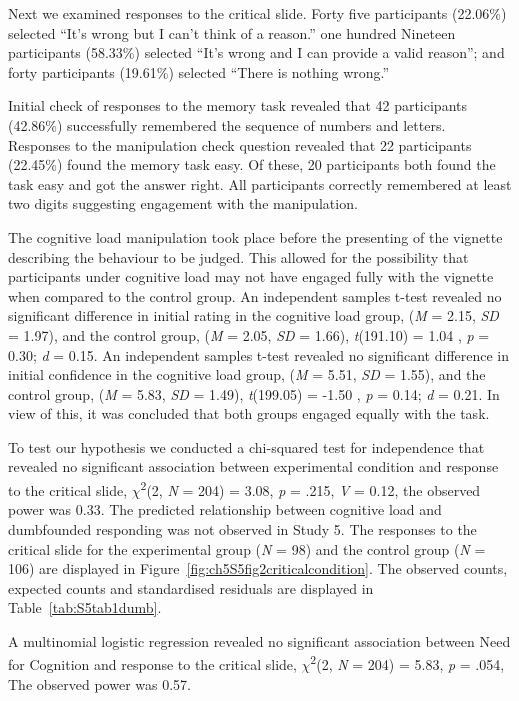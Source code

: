 \documentclass[
  american,
  man,floatsintext]{apa7}
\begin{document}
Next we examined responses to the critical slide. Forty five participants (22.06\%) selected ``It's wrong but I can't think of a reason.'' one hundred Nineteen participants (58.33\%) selected ``It's wrong and I can provide a valid reason''; and forty participants (19.61\%) selected ``There is nothing wrong.''

Initial check of responses to the memory task revealed that 42 participants (42.86\%) successfully remembered the sequence of numbers and letters. Responses to the manipulation check question revealed that 22 participants (22.45\%) found the memory task easy. Of these, 20 participants both found the task easy and got the answer right. All participants correctly remembered at least two digits suggesting engagement with the manipulation.

The cognitive load manipulation took place before the presenting of the vignette describing the behaviour to be judged. This allowed for the possibility that participants under cognitive load may not have engaged fully with the vignette when compared to the control group. An independent samples t-test revealed no significant difference in initial rating in the cognitive load group, (\emph{M} = 2.15, \emph{SD} = 1.97), and the control group, (\emph{M} = 2.05, \emph{SD} = 1.66), \emph{t}(191.10) = 1.04 , \emph{p} = 0.30; \emph{d} = 0.15. An independent samples t-test revealed no significant difference in initial confidence in the cognitive load group, (\emph{M} = 5.51, \emph{SD} = 1.55), and the control group, (\emph{M} = 5.83, \emph{SD} = 1.49), \emph{t}(199.05) = -1.50 , \emph{p} = 0.14; \emph{d} = 0.21. In view of this, it was concluded that both groups engaged equally with the task.

To test our hypothesis we conducted a chi-squared test for independence that revealed no significant association between experimental condition and response to the critical slide, \(\chi\)\textsuperscript{2}(2, \emph{N} = 204) = 3.08, \emph{p} = .215, \emph{V} = 0.12, the observed power was 0.33. The predicted relationship between cognitive load and dumbfounded responding was not observed in Study 5. The responses to the critical slide for the experimental group (\emph{N} = 98) and the control group (\emph{N} = 106) are displayed in Figure~\ref{fig:ch5S5fig2criticalcondition}. The observed counts, expected counts and standardised residuals are displayed in Table~\ref{tab:S5tab1dumb}.

A multinomial logistic regression revealed no significant association between Need for Cognition and response to the critical slide, \(\chi\)\textsuperscript{2}(2, \emph{N} = 204) = 5.83, \emph{p} = .054, The observed
power was 0.57.
\end{document}
